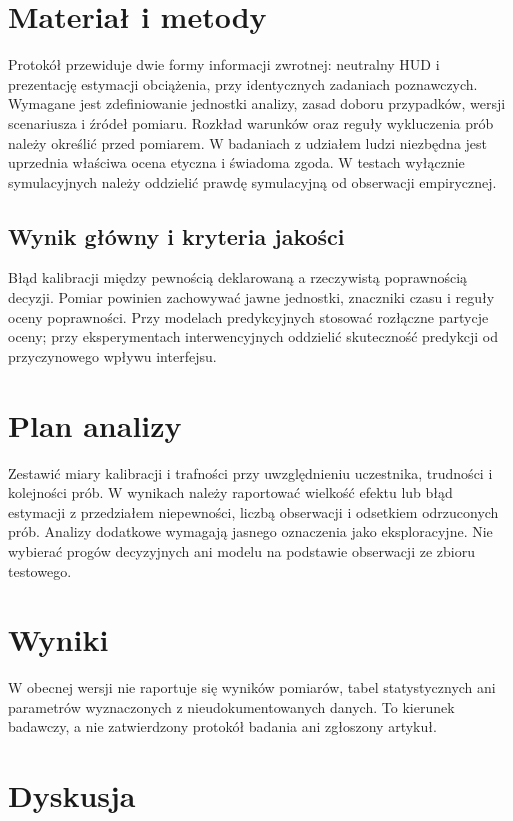 \documentclass[11pt,a4paper]{article}
\begin{document}
\section{Materiał i metody}

Protokół przewiduje dwie formy informacji zwrotnej: neutralny HUD i prezentację estymacji obciążenia, przy identycznych zadaniach poznawczych. Wymagane jest zdefiniowanie jednostki analizy, zasad doboru przypadków, wersji scenariusza i źródeł pomiaru. Rozkład warunków oraz reguły wykluczenia prób należy określić przed pomiarem. W badaniach z udziałem ludzi niezbędna jest uprzednia właściwa ocena etyczna i świadoma zgoda. W testach wyłącznie symulacyjnych należy oddzielić prawdę symulacyjną od obserwacji empirycznej.

\subsection{Wynik główny i kryteria jakości}

Błąd kalibracji między pewnością deklarowaną a rzeczywistą poprawnością decyzji. Pomiar powinien zachowywać jawne jednostki, znaczniki czasu i reguły oceny poprawności. Przy modelach predykcyjnych stosować rozłączne partycje oceny; przy eksperymentach interwencyjnych oddzielić skuteczność predykcji od przyczynowego wpływu interfejsu.

\section{Plan analizy}

Zestawić miary kalibracji i trafności przy uwzględnieniu uczestnika, trudności i kolejności prób. W wynikach należy raportować wielkość efektu lub błąd estymacji z przedziałem niepewności, liczbą obserwacji i odsetkiem odrzuconych prób. Analizy dodatkowe wymagają jasnego oznaczenia jako eksploracyjne. Nie wybierać progów decyzyjnych ani modelu na podstawie obserwacji ze zbioru testowego.

\section{Wyniki}

W obecnej wersji nie raportuje się wyników pomiarów, tabel statystycznych ani parametrów wyznaczonych z nieudokumentowanych danych. To kierunek badawczy, a nie zatwierdzony protokół badania ani zgłoszony artykuł.

\section{Dyskusja}
\end{document}
